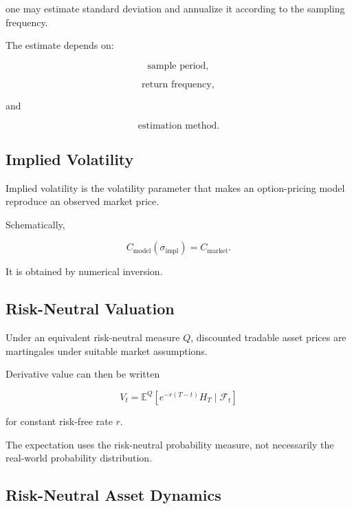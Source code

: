one may estimate standard deviation and annualize it according to the
sampling frequency.

The estimate depends on:

\[
\boxed{
\text{sample period},
}
\]

\[
\boxed{
\text{return frequency},
}
\]

and

\[
\boxed{
\text{estimation method}.
}
\]

\subsection{Implied Volatility}
\label{subsec:implied-volatility}

Implied volatility is the volatility parameter that makes an option-pricing
model reproduce an observed market price.

Schematically,

\[
\boxed{
C_{\mathrm{model}}(\sigma_{\mathrm{impl}})
=
C_{\mathrm{market}}.
}
\]

It is obtained by numerical inversion.

\subsection{Risk-Neutral Valuation}
\label{subsec:risk-neutral-valuation}

Under an equivalent risk-neutral measure \(Q\), discounted tradable asset
prices are martingales under suitable market assumptions.

Derivative value can then be written

\[
\boxed{
V_t
=
\mathbb{E}^{Q}
\left[
e^{-r(T-t)}
H_T
\mid
\mathcal{F}_t
\right]
}
\]

for constant risk-free rate \(r\).

The expectation uses the risk-neutral probability measure, not necessarily
the real-world probability distribution.

\subsection{Risk-Neutral Asset Dynamics}
\label{subsec:risk-neutral-asset-dynamics}

